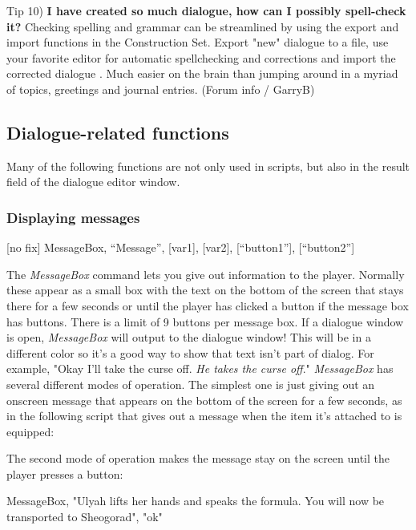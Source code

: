 \documentclass[
]{article}
\begin{document}
Tip 10) \textbf{I have created so much dialogue, how can I possibly
spell-check it?} Checking spelling and grammar can be streamlined by
using the export and import functions in the Construction Set. Export
"new" dialogue to a file, use your favorite editor for automatic
spellchecking and corrections and import the corrected dialogue . Much
easier on the brain than jumping around in a myriad of topics, greetings
and journal entries. (Forum info / GarryB)

\hypertarget{dialogue-related-functions}{%
\subsection{Dialogue-related
functions}\label{dialogue-related-functions}}

Many of the following functions are not only used in scripts, but also
in the result field of the dialogue editor window.

\hypertarget{displaying-messages}{%
\subsubsection{Displaying messages}\label{displaying-messages}}

{[}no fix{]} MessageBox, ``Message'', {[}var1{]}, {[}var2{]},
{[}``button1''{]}, {[}``button2''{]}

The \emph{MessageBox} command lets you give out information to the
player. Normally these appear as a small box with the text on the bottom
of the screen that stays there for a few seconds or until the player has
clicked a button if the message box has buttons. There is a limit of 9
buttons per message box. If a dialogue window is open, \emph{MessageBox}
will output to the dialogue window! This will be in a different color so
it's a good way to show that text isn't part of dialog. For example,
"Okay I'll take the curse off. \emph{He takes the curse off}."
\emph{MessageBox} has several different modes of operation. The simplest
one is just giving out an onscreen message that appears on the bottom of
the screen for a few seconds, as in the following script that gives out
a message when the item it's attached to is equipped:



The second mode of operation makes the message stay on the screen until
the player presses a button:

MessageBox, "Ulyah lifts her hands and speaks the formula. You will now
be transported to Sheogorad", "ok"
\end{document}
